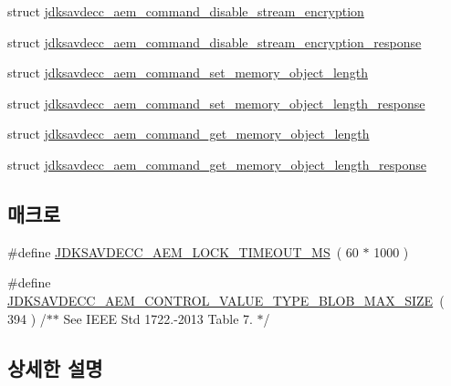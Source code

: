 \begin{DoxyCompactItemize}
\item 
struct \hyperlink{structjdksavdecc__aem__command__disable__stream__encryption}{jdksavdecc\+\_\+aem\+\_\+command\+\_\+disable\+\_\+stream\+\_\+encryption}
\item 
struct \hyperlink{structjdksavdecc__aem__command__disable__stream__encryption__response}{jdksavdecc\+\_\+aem\+\_\+command\+\_\+disable\+\_\+stream\+\_\+encryption\+\_\+response}
\item 
struct \hyperlink{structjdksavdecc__aem__command__set__memory__object__length}{jdksavdecc\+\_\+aem\+\_\+command\+\_\+set\+\_\+memory\+\_\+object\+\_\+length}
\item 
struct \hyperlink{structjdksavdecc__aem__command__set__memory__object__length__response}{jdksavdecc\+\_\+aem\+\_\+command\+\_\+set\+\_\+memory\+\_\+object\+\_\+length\+\_\+response}
\item 
struct \hyperlink{structjdksavdecc__aem__command__get__memory__object__length}{jdksavdecc\+\_\+aem\+\_\+command\+\_\+get\+\_\+memory\+\_\+object\+\_\+length}
\item 
struct \hyperlink{structjdksavdecc__aem__command__get__memory__object__length__response}{jdksavdecc\+\_\+aem\+\_\+command\+\_\+get\+\_\+memory\+\_\+object\+\_\+length\+\_\+response}
\end{DoxyCompactItemize}
\subsection*{매크로}
\begin{DoxyCompactItemize}
\item 
\#define \hyperlink{group__aem__command_ga442bb372db80a149cac7161e9e7e898f}{J\+D\+K\+S\+A\+V\+D\+E\+C\+C\+\_\+\+A\+E\+M\+\_\+\+L\+O\+C\+K\+\_\+\+T\+I\+M\+E\+O\+U\+T\+\_\+\+MS}~( 60 $\ast$ 1000 )
\item 
\#define \hyperlink{group__aem__command_ga91176affe15020f1b22b04518eeb3d30}{J\+D\+K\+S\+A\+V\+D\+E\+C\+C\+\_\+\+A\+E\+M\+\_\+\+C\+O\+N\+T\+R\+O\+L\+\_\+\+V\+A\+L\+U\+E\+\_\+\+T\+Y\+P\+E\+\_\+\+B\+L\+O\+B\+\_\+\+M\+A\+X\+\_\+\+S\+I\+ZE}~( 394 ) /$\ast$$\ast$ See I\+E\+EE Std 1722.-\/2013 Table 7. $\ast$/
\end{DoxyCompactItemize}


\subsection{상세한 설명}


